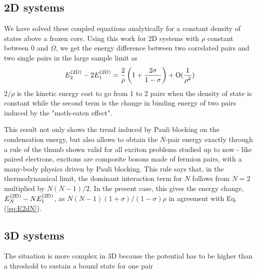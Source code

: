 \documentclass[5p,twocolumn]{elsarticle}
\begin{document}
\subsection{2D systems}
We have solved these coupled equations analytically for a constant density of states above a frozen core\cite{combescotBCS}.  Using  this work  for 2D systems with $\rho$ constant between $0$ and $\Omega$, we get the energy difference between two correlated pairs and two single pairs in the large sample limit as 
\begin{equation}
E^{{{\text{(2D)}}}}_2-2E_1^{{{\text{(2D)}}}}=\frac{2}{\rho}\left(1+\frac{2\sigma}{1-\sigma}\right)+\text{O}(\frac{1}{\rho^2})
\label{eq:}
\end{equation}
 $2/\rho$ is the kinetic energy cost to go from 1 to 2 pairs when the density of state is constant while the second term is the change in binding energy of two pairs induced by the "moth-eaten effect". 

This result not only shows the trend induced by Pauli blocking on the condensation energy, but also allows to obtain the $N$-pair energy exactly through a rule of the thumb shown valid for all exciton problems studied up to now - like paired electrons, excitons are composite bosons made of fermion pairs, with a many-body physics driven by Pauli blocking.  This rule says that, in the thermodynamical limit, the dominant interaction term for $N$ follows from $N= 2$ multiplied by $N(N-1)/2$.  In the present case, this gives the energy change, $E^{{{\text{(2D)}}}}_N-NE^{{{\text{(2D)}}}}_1$, as $N(N-1)(1+\sigma)/(1-\sigma)\rho$ in agreement with
Eq.(\ref{eq:E2dN}).


\subsection{3D systems}

The situation is more complex in 3D because the potential has to be higher than a threshold to sustain a bound state for one pair
\end{document}
